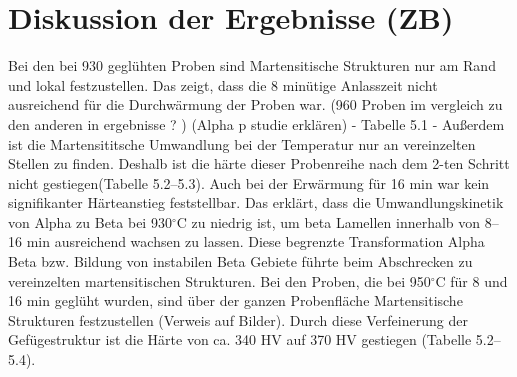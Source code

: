 \section{Diskussion der Ergebnisse (ZB)}

Bei  den bei 930  geglühten Proben sind Martensitische Strukturen nur  am Rand und lokal festzustellen. Das zeigt, dass die 8 minütige Anlasszeit nicht ausreichend für die Durchwärmung der Proben war. (960 Proben im vergleich zu den anderen in ergebnisse ? )
(Alpha p studie erklären) - Tabelle 5.1 - 
Außerdem ist die Martensititsche Umwandlung bei der Temperatur  nur an vereinzelten  Stellen zu finden. Deshalb ist die härte dieser Probenreihe nach dem 2-ten Schritt nicht gestiegen(Tabelle 5.2--5.3). Auch bei der Erwärmung für 16 min war kein signifikanter Härteanstieg feststellbar. Das erklärt, dass die Umwandlungskinetik von Alpha zu Beta bei 930$^\circ$C zu niedrig ist, um beta Lamellen  innerhalb von 8--16 min ausreichend  wachsen zu lassen. Diese begrenzte Transformation Alpha Beta bzw. Bildung von instabilen Beta Gebiete führte  beim Abschrecken zu vereinzelten martensitischen Strukturen.
Bei den Proben, die bei 950$^\circ$C für 8 und 16 min geglüht wurden, sind über der ganzen Probenfläche Martensitische Strukturen festzustellen (Verweis auf Bilder). Durch diese Verfeinerung der Gefügestruktur ist die Härte von ca. 340 HV auf 370 HV gestiegen (Tabelle 5.2--5.4). 

